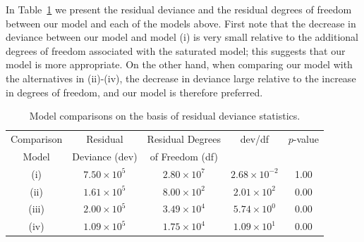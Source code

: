 \documentclass[10pt,twoside,openright]{report}
\begin{document}
In Table~\ref{table:goodnessoffit} we present the residual deviance and the residual degrees of freedom between our model and each of the models above. First note that the decrease in deviance between our model and model (i) is very small relative to the additional degrees of freedom associated with the saturated model; this suggests that our model is more appropriate. On the other hand, when comparing our model with the alternatives in (ii)-(iv), the decrease in deviance large relative to the increase in degrees of freedom, and our model is therefore preferred.    




\begin{table}[ht]
\begin{center}
\caption{Model comparisons on the basis of residual deviance statistics. \label{table:goodnessoffit}}
\begin{tabular}{ || c || c | c | c  | c ||}
\hline
\hline
Comparison  & Residual  & Residual Degrees & dev/df & $p$-value \\
Model            & Deviance (dev)             & of Freedom (df)  &        &           \\
\hline
\hline
(i) &  $7.50 \times 10^5$  & $2.80\times 10^7$  &  $2.68 \times 10^{-2}$   &  1.00 \\
\hline
(ii)  &  $1.61 \times 10^5$  &  $8.00 \times 10^2$  &  $2.01 \times 10^2$ &  0.00\\
(iii)  &  $2.00 \times 10^5$ & $3.49 \times 10^4$  & $5.74 \times 10^0$&  0.00 \\
(iv) & $1.09 \times 10^5$ & $1.75 \times 10^4$ & $1.09 \times 10^1$ & 0.00 \\
\hline
\hline
\end{tabular}
\vspace*{-10mm}
\end{center}
\end{table}
\end{document}
